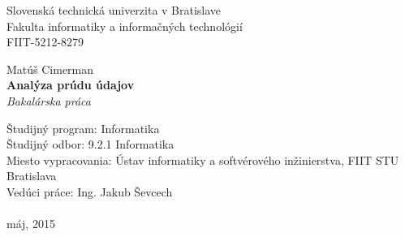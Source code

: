 \documentclass[12pt, a4paper, titlepage, slovak]{book}
\begin{document}
\begin{titlepage}
\begin{center}                                                                                                                                                   
{\Large Slovenská technická univerzita v Bratislave} \\
{\Large Fakulta informatiky a informačných technológií} \\
\vspace*{1\baselineskip}
\large {FIIT-5212-8279}
\vfill %


{{Matúš Cimerman}} \\
\vspace*{1\baselineskip}
{\huge {\textbf{Analýza prúdu údajov}}} %
\\
\vspace*{1\baselineskip}
\textit{Bakalárska práca}\\
\vfill %
\end{center}
{Študijný program: Informatika}\\
{Študijný odbor: 9.2.1 Informatika}\\
{Miesto vypracovania: Ústav informatiky a softvérového inžinierstva, FIIT STU Bratislava}\\
{Vedúci práce: Ing. Jakub Ševcech}\\
\\
{máj, 2015}

\end{titlepage}
\restoregeometry
\thispagestyle{empty}
\emptydoublepage

%




\emptydoublepage


\emptydoublepage

%

\renewcommand{\contentsname}{Obsah}
\singlespacing
\tableofcontents
\end{document}
